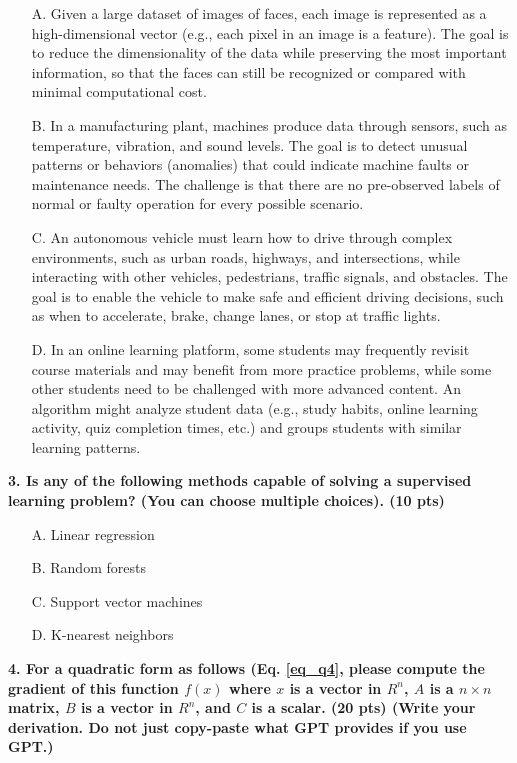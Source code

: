 \documentclass{article}
\begin{document}
\begin{itemize}
    \item[A.] Given a large dataset of images of faces, each image is represented as a high-dimensional vector (e.g., each pixel in an image is a feature). The goal is to reduce the dimensionality of the data while preserving the most important information, so that the faces can still be recognized or compared with minimal computational cost.
    \item[B.] In a manufacturing plant, machines produce data through sensors, such as temperature, vibration, and sound levels. The goal is to detect unusual patterns or behaviors (anomalies) that could indicate machine faults or maintenance needs. The challenge is that there are no pre-observed labels of normal or faulty operation for every possible scenario.
    \item[C.] An autonomous vehicle must learn how to drive through complex environments, such as urban roads, highways, and intersections, while interacting with other vehicles, pedestrians, traffic signals, and obstacles. The goal is to enable the vehicle to make safe and efficient driving decisions, such as when to accelerate, brake, change lanes, or stop at traffic lights.
    \item[D.] In an online learning platform, some students may frequently revisit course materials and may benefit from more practice problems, while some other students need to be challenged with more advanced content. An algorithm might analyze student data (e.g., study habits, online learning activity, quiz completion times, etc.) and groups students with similar learning patterns.
\end{itemize}

\textbf{3. Is any of the following methods capable of solving a supervised learning problem? (You can choose multiple choices). (10 pts)}

\begin{itemize}
    \item[A.] Linear regression
    \item[B.] Random forests
    \item[C.] Support vector machines
    \item[D.] K-nearest neighbors
\end{itemize}


\textbf{4. For a quadratic form as follows (Eq. \ref{eq_q4}, please compute the gradient of this function $f(x)$ where $x$ is a vector in $R^n$, $A$ is a $n \times n$ matrix, $B$ is a vector in $R^n$, and $C$ is a scalar. (20 pts) (Write your derivation. Do not just copy-paste what GPT provides if you use GPT.)}
\end{document}

